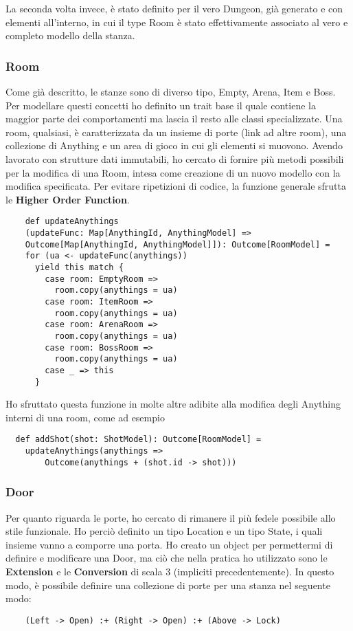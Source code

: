 La seconda volta invece, è stato definito per il vero Dungeon, già generato e con elementi all'interno, in cui il type Room è stato effettivamente associato al vero e completo modello della stanza.

\subsubsection{Room}
Come già descritto, le stanze sono di diverso tipo, Empty, Arena, Item e Boss. Per modellare questi concetti ho definito un trait base il quale contiene la maggior parte dei comportamenti ma lascia il resto alle classi specializzate. 
Una room, qualsiasi, è caratterizzata da un insieme di porte (link ad altre room), una collezione di Anything e un area di gioco in cui gli elementi si muovono. 
Avendo lavorato con strutture dati immutabili, ho cercato di fornire più metodi possibili per la modifica di una Room, intesa come creazione di un nuovo modello con la modifica specificata. Per evitare ripetizioni di codice, la funzione generale sfrutta le \textbf{Higher Order Function}. 
\begin{lstlisting}
    def updateAnythings
    (updateFunc: Map[AnythingId, AnythingModel] => 
    Outcome[Map[AnythingId, AnythingModel]]): Outcome[RoomModel] =
    for (ua <- updateFunc(anythings))
      yield this match {
        case room: EmptyRoom =>
          room.copy(anythings = ua)
        case room: ItemRoom =>
          room.copy(anythings = ua)
        case room: ArenaRoom =>
          room.copy(anythings = ua)
        case room: BossRoom =>
          room.copy(anythings = ua)
        case _ => this
      }
\end{lstlisting}

Ho sfruttato questa funzione in molte altre adibite alla modifica degli Anything interni di una room, come ad esempio 
\begin{lstlisting}
  def addShot(shot: ShotModel): Outcome[RoomModel] =
    updateAnythings(anythings => 
        Outcome(anythings + (shot.id -> shot)))
\end{lstlisting}

\subsubsection{Door}
Per quanto riguarda le porte, ho cercato di rimanere il più fedele possibile allo stile funzionale. Ho perciò definito un tipo Location e un tipo State, i quali insieme vanno a comporre una porta.
Ho creato un object per permettermi di definire e modificare una Door, ma ciò che nella pratica ho utilizzato sono le \textbf{Extension} e le \textbf{Conversion} di scala 3 (impliciti precedentemente).
In questo modo, è possibile definire una collezione di porte per una stanza nel seguente modo: 
\begin{lstlisting}
    (Left -> Open) :+ (Right -> Open) :+ (Above -> Lock)
\end{lstlisting}

